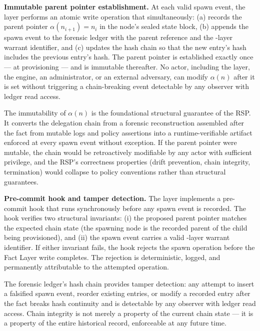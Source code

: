 \medskip
\noindent\textbf{Immutable parent pointer establishment.} At each valid spawn event, the \fact{} layer performs an atomic write operation that simultaneously: (a) records the parent pointer $\alpha(n_{i+1}) = n_i$ in the node's sealed state block, (b) appends the spawn event to the forensic ledger with the parent reference and the \purpose{}-layer warrant identifier, and (c) updates the hash chain so that the new entry's hash includes the previous entry's hash. The parent pointer is established exactly once --- at provisioning --- and is immutable thereafter. No actor, including the \purpose{} layer, the \bounds{} engine, an administrator, or an external adversary, can modify $\alpha(n)$ after it is set without triggering a chain-breaking event detectable by any observer with ledger read access.

The immutability of $\alpha(n)$ is the foundational structural guarantee of the RSP. It converts the delegation chain from a forensic reconstruction assembled after the fact from mutable logs and policy assertions into a runtime-verifiable artifact enforced at every spawn event without exception. If the parent pointer were mutable, the chain would be retroactively modifiable by any actor with sufficient privilege, and the RSP's correctness properties (drift prevention, chain integrity, termination) would collapse to policy conventions rather than structural guarantees.

\medskip
\noindent\textbf{Pre-commit hook and tamper detection.} The \fact{} layer implements a pre-commit hook that runs synchronously before any spawn event is recorded. The hook verifies two structural invariants: (i) the proposed parent pointer matches the expected chain state (the spawning node is the recorded parent of the child being provisioned), and (ii) the spawn event carries a valid \purpose{}-layer warrant identifier. If either invariant fails, the hook rejects the spawn operation before the Fact Layer write completes. The rejection is deterministic, logged, and permanently attributable to the attempted operation.

The forensic ledger's hash chain provides tamper detection: any attempt to insert a falsified spawn event, reorder existing entries, or modify a recorded entry after the fact breaks hash continuity and is detectable by any observer with ledger read access. Chain integrity is not merely a property of the current chain state --- it is a property of the entire historical record, enforceable at any future time.

